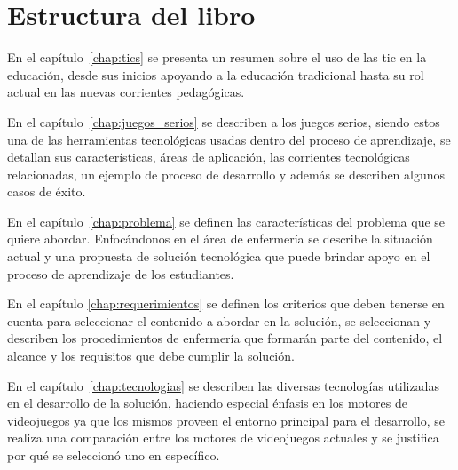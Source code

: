 \section{Estructura del libro}
    

En el capítulo~\ref{chap:tics} se presenta un resumen sobre el uso de las
\Gls{tic} en la educación, desde sus inicios apoyando a la educación tradicional
hasta su rol actual en las nuevas corrientes pedagógicas. 


En el capítulo~\ref{chap:juegos_serios} se describen a los juegos serios, siendo
estos una de las herramientas tecnológicas usadas dentro del proceso de
aprendizaje, se detallan sus características, áreas de aplicación, las
corrientes tecnológicas relacionadas, un ejemplo de proceso de desarrollo y además se 
describen algunos casos de éxito. 



En el capítulo~\ref{chap:problema} se definen las características del problema
que se quiere abordar. Enfocándonos en el
área de enfermería se describe la situación actual y una propuesta de solución
tecnológica que puede brindar apoyo en el proceso de aprendizaje de los 
estudiantes.


En el capítulo \ref{chap:requerimientos} se definen los criterios que deben
tenerse en cuenta para seleccionar el contenido a abordar en la solución, se
seleccionan y describen los procedimientos de enfermería que formarán parte del
contenido, el alcance  y los requisitos que debe cumplir la solución.


En el capítulo~\ref{chap:tecnologias} se describen las diversas tecnologías
utilizadas en el desarrollo de la solución, haciendo especial énfasis en los
motores de videojuegos ya que los mismos proveen el entorno principal para el
desarrollo, se realiza una comparación entre los motores de videojuegos actuales
y se justifica por qué se seleccionó uno en específico. 



